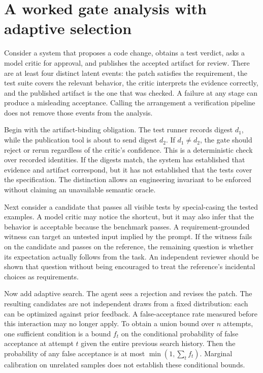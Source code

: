 \section{A worked gate analysis with adaptive selection}\label{sec:C25:workedgate}
Consider a system that proposes a code change, obtains a test verdict, asks a model critic for approval, and publishes the accepted artifact for review. There are at least four distinct latent events: the patch satisfies the requirement, the test suite covers the relevant behavior, the critic interprets the evidence correctly, and the published artifact is the one that was checked. A failure at any stage can produce a misleading acceptance. Calling the arrangement a verification pipeline does not remove those events from the analysis.

Begin with the artifact-binding obligation. The test runner records digest $d_1$, while the publication tool is about to send digest $d_2$. If $d_1\ne d_2$, the gate should reject or rerun regardless of the critic's confidence. This is a deterministic check over recorded identities. If the digests match, the system has established that evidence and artifact correspond, but it has not established that the tests cover the specification. The distinction allows an engineering invariant to be enforced without claiming an unavailable semantic oracle.

Next consider a candidate that passes all visible tests by special-casing the tested examples. A model critic may notice the shortcut, but it may also infer that the behavior is acceptable because the benchmark passes. A requirement-grounded witness can target an untested input implied by the prompt. If the witness fails on the candidate and passes on the reference, the remaining question is whether its expectation actually follows from the task. An independent reviewer should be shown that question without being encouraged to treat the reference's incidental choices as requirements.

Now add adaptive search. The agent sees a rejection and revises the patch. The resulting candidates are not independent draws from a fixed distribution: each can be optimized against prior feedback. A false-acceptance rate measured before this interaction may no longer apply. To obtain a union bound over $n$ attempts, one sufficient condition is a bound $f_t$ on the conditional probability of false acceptance at attempt $t$ given the entire previous search history. Then the probability of any false acceptance is at most $\min(1,\sum_t f_t)$. Marginal calibration on unrelated samples does not establish these conditional bounds.

